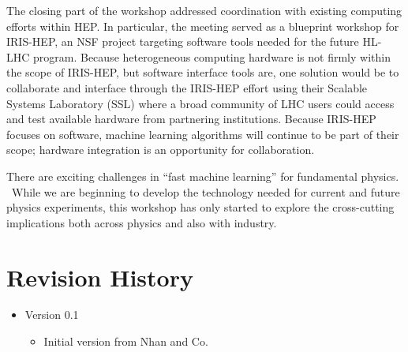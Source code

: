 \documentclass[11pt,letterpaper,fleqn]{article}
\begin{document}

The closing part of the workshop addressed coordination with existing computing efforts within HEP. In particular, the meeting served as a blueprint workshop for IRIS-HEP, an NSF project targeting software tools needed for the future HL-LHC program. Because heterogeneous computing hardware is not firmly within the scope of IRIS-HEP, but software interface tools are, one solution would be to collaborate and interface through the IRIS-HEP effort using their Scalable Systems Laboratory (SSL) where a broad community of LHC users could access and test available hardware from partnering institutions.  Because IRIS-HEP focuses on software, machine learning algorithms will continue to be part of their scope; hardware integration is an opportunity for collaboration.

There are exciting challenges in ``fast machine learning'' for fundamental physics.  While we are beginning to develop the technology needed for current and future physics experiments, this workshop has only started to explore the cross-cutting implications both across physics and also with industry.



\appendix
\newpage
\section{Revision History}

\vspace{8pt}
\begin{itemize}
  \item Version 0.1
  \vspace{-5pt}
  \begin{itemize}
    \item Initial version from Nhan and Co.
  \end{itemize}
\end{itemize}
\end{document}
